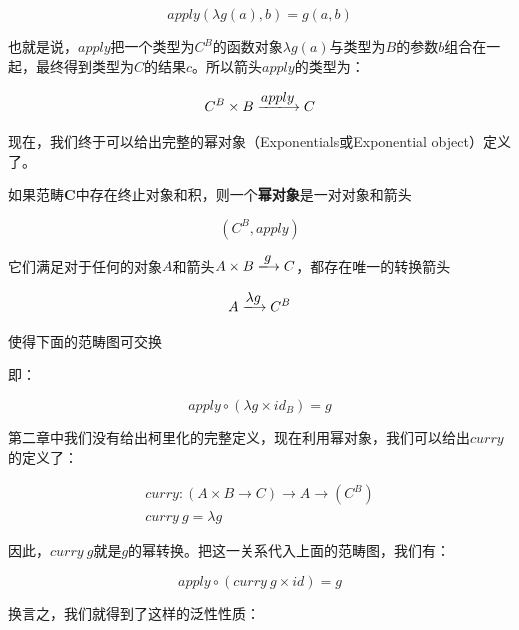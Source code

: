 \documentclass[b5paper]{ctexart}
\begin{document}
\[
apply(\lambda g(a), b) = g(a, b)
\]

也就是说，$apply$把一个类型为$C^B$的函数对象$\lambda g(a)$与类型为$B$的参数$b$组合在一起，最终得到类型为$C$的结果$c$。所以箭头$apply$的类型为：

\[
C^B \times B \arrowto{apply} C
\]

现在，我们终于可以给出完整的幂对象（Exponentials或Exponential object）定义了。

\begin{definition}
如果范畴$\pmb{C}$中存在终止对象和积，则一个\textbf{幂对象}是一对对象和箭头

\[
(C^B, apply)
\]

它们满足对于任何的对象$A$和箭头$A \times B \arrowto{g} C$，都存在唯一的转换箭头

\[
 A \arrowto{\lambda g} C^B
\]

使得下面的范畴图可交换

\begin{center}
\end{center}

即：

\[
  apply \circ (\lambda g \times id_B) = g
\]

\end{definition}

第二章中我们没有给出柯里化的完整定义，现在利用幂对象，我们可以给出$curry$的定义了：

\[
\begin{array}{l}
curry : (A \times B \to C) \to A \to (C^B) \\
curry\ g = \lambda g
\end{array}
\]

因此，$curry\ g$就是$g$的幂转换。把这一关系代入上面的范畴图，我们有：

\[
  apply \circ (curry\ g \times id) = g
\]

换言之，我们就得到了这样的泛性性质：
\end{document}
